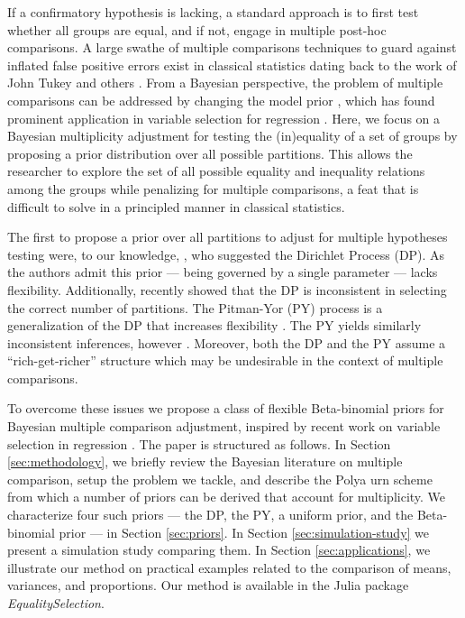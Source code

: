 \documentclass[11pt,a4paper]{article}
\theoremstyle{definition} %
\theoremstyle{case}
\begin{document}
If a confirmatory hypothesis is lacking, a standard approach is to first test whether all groups are equal, and if not, engage in multiple post-hoc comparisons. A large swathe of multiple comparisons techniques to guard against inflated false positive errors exist in classical statistics dating back to the work of John Tukey and others \parencite[][]{rao2009multiple, benjamini2002john}. From a Bayesian perspective, the problem of multiple comparisons can be addressed by changing the model prior \parencite{jeffreys1961theory, westfall1997bayesian, berry1999bayesian}, which has found prominent application in variable selection for regression \parencite[e.g.,][]{scott2006exploration, scott2010bayes}. Here, we focus on a Bayesian multiplicity adjustment for testing the (in)equality of a set of groups by proposing a prior distribution over all possible partitions. This allows the researcher to explore the set of all possible equality and inequality relations among the groups while penalizing for multiple comparisons, a feat that is difficult to solve in a principled manner in classical statistics.

The first to propose a prior over all partitions to adjust for multiple hypotheses testing were, to our knowledge, \textcite{gopalan1998bayesian}, who suggested the Dirichlet Process (DP). As the authors admit this prior --- being governed by a single parameter --- lacks flexibility. Additionally, \textcite{miller2013simple} recently showed that the DP is inconsistent in selecting the correct number of partitions. The Pitman-Yor (PY) process is a generalization of the DP that increases flexibility \parencite{pitman1997two}. The PY yields similarly inconsistent inferences, however \parencite{miller2014inconsistency}. Moreover, both the DP and the PY assume a ``rich-get-richer'' structure which may be undesirable in the context of multiple comparisons.

To overcome these issues we propose a class of flexible Beta-binomial priors for Bayesian multiple comparison adjustment, inspired by recent work on variable selection in regression \parencite{scott2006exploration, scott2010bayes}. The paper is structured as follows. In Section \ref{sec:methodology}, we briefly review the Bayesian literature on multiple comparison, setup the problem we tackle, and describe the Polya urn scheme from which a number of priors can be derived that account for multiplicity. We characterize four such priors --- the DP, the PY, a uniform prior, and the Beta-binomial prior --- in Section \ref{sec:priors}. In Section \ref{sec:simulation-study} we present a simulation study comparing them. In Section \ref{sec:applications}, we illustrate our method on practical examples related to the comparison of means, variances, and proportions. Our method is available in the Julia package \textit{EqualitySelection}.
\end{document}
